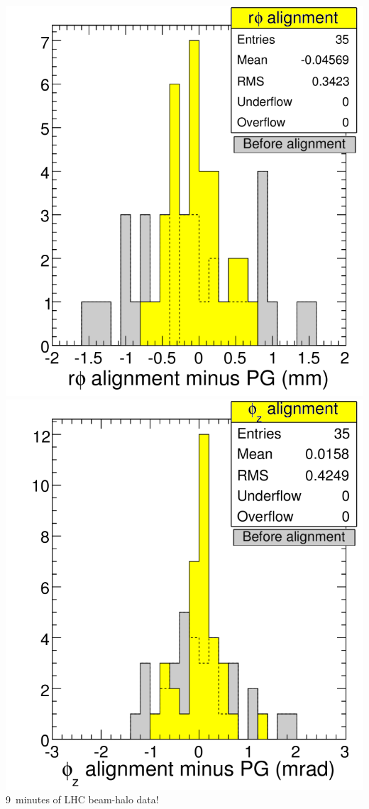 \documentclass[compress]{beamer}
\begin{document}
\begin{frame}
\vfill
\begin{columns}
\includegraphics[width=\linewidth]{data_rphi.png}
\includegraphics[width=\linewidth]{data_phiz.png}
9~minutes of LHC beam-halo data!
\end{columns}
\end{frame}
\end{document}
